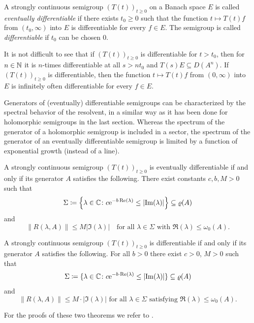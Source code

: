 \begin{definition}\label{def:a2-1.16}
A strongly continuous semigroup $(T(t))_{t \geq 0}$ on a Banach space $E$ is called \emph{eventually differentiable} if there exists $t_0 \geq 0$ such that the function $t \mapsto T(t)f$ from $(t_0,\infty)$ into $E$ is differentiable for every $f \in E$.
The semigroup is called \emph{differentiable} if\/ $t_0$ can be chosen $0$.
\end{definition}

It is not difficult to see that if\/ $(T(t))_{t \geq 0}$ is differentiable for $t > t_{0}$, then for $n \in \mathbb{N}$ it is $n$-times differentiable at all $s > nt_{0}$ and $T(s)E \subseteq D(A^n)$. 
If\/ $(T(t))_{t\geq 0}$ is differentiable, then the function $t \mapsto T(t)f$ from $(0,\infty)$ into $E$ is infinitely often differentiable for every $f \in E$.

Generators of (eventually) differentiable semigroups 
can be characterized by the spectral behavior of the resolvent,
in a similar way as it has been done for holomorphic semigroups in the last section.
Whereas the spectrum of the generator of a holomorphic semigroup is included in a sector, the spectrum of the generator of an eventually differentiable semigroup is limited by a function of exponential growth (instead of a line).
\begin{theorem}\label{thm:a2-1.17}
A strongly continuous semigroup $(T(t))_{t\geq 0}$ is eventually
differentiable if and only if its generator $A$ satisfies the following.
There exist constants $c, b, M > 0$ such that
\[
    \Sigma \coloneq \left\{\lambda \in \C \colon 
        c\eu^{-b\Re(\lambda)} \leq \lvert\Im(\lambda)\rvert
    \right\} \subseteq \rho(A)
\]
and
\[
    \lVert R(\lambda,A) \rVert \leq M \lvert\Im(\lambda)\rvert
    \quad \text{for all } \lambda \in \Sigma 
    \text{ with } \Re(\lambda) \leq \omega_0(A).
\]
\end{theorem}
\begin{theorem}\label{thm:a2-1.18}
A strongly continuous semigroup $(T(t))_{t\geq 0}$ is differentiable if and only if its generator $A$ satisfies the following. 
For all $b>0$ there exist $c>0$, $M>0$ such that
\[
    \Sigma \coloneq \{\lambda \in \C \colon c\eu^{-b\cdot \Re(\lambda)} 
    	\leq  \lvert \Im(\lambda) \rvert\} \subseteq \rho(A)
\]
and
\[
    \|R(\lambda,A)\| \leq M\cdot \lvert \Im(\lambda) \rvert \text{ for all } \lambda \in \Sigma \text{ satisfying } \Re(\lambda) \leq \omega_{0}(A).
\]
\end{theorem}
For the proofs of these two theorems we refer to \textcite[Chapter 3, Theorem 4.7 and 4.8]{pazy:1983}.
